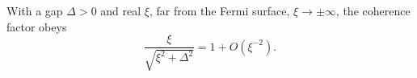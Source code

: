 \documentclass{article}
\begin{document}
With a gap $\Delta>0$ and real $\xi$, far from the Fermi surface, $\xi\to\pm\infty$, the coherence factor obeys
\begin{equation}
\frac{\xi}{\sqrt{\xi^2+\Delta^2}} = 1 + O(\xi^{-2}) .
\label{eq:far}
\end{equation}
\end{document}
